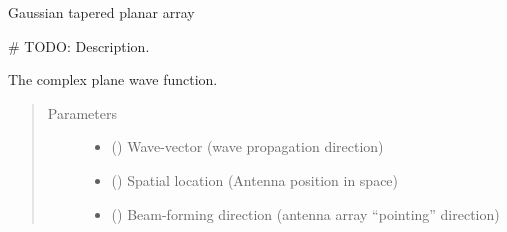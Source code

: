 \documentclass[letterpaper,10pt,english]{sphinxmanual}
\begin{document}
\begin{fulllineitems}
\label{\detokenize{modules/antenna_library:antenna_library.planar}}
Gaussian tapered planar array

\end{fulllineitems}


\begin{fulllineitems}
\label{\detokenize{modules/antenna_library:antenna_library.planar_beam}}
\# TODO: Description.

\end{fulllineitems}


\begin{fulllineitems}
\label{\detokenize{modules/antenna_library:antenna_library.plane_wave}}
The complex plane wave function.
\begin{quote}\begin{description}
\item[{Parameters}] \leavevmode\begin{itemize}
\item {} 
 () \textendash{} Wave-vector (wave propagation direction)

\item {} 
 () \textendash{} Spatial location (Antenna position in space)

\item {} 
 () \textendash{} Beam-forming direction (antenna array “pointing” direction)

\end{itemize}

\end{description}\end{quote}

\end{fulllineitems}
\end{document}
